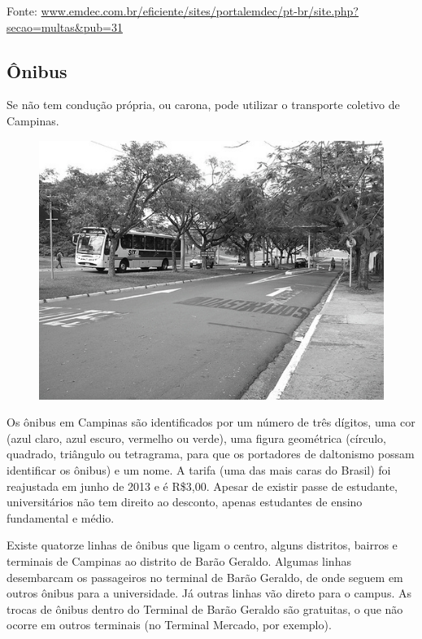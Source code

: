 Fonte: \url{www.emdec.com.br/eficiente/sites/portalemdec/pt-br/site.php?secao=multas&pub=31}

\subsection{Ônibus}

Se não tem condução própria, ou carona, pode utilizar o transporte coletivo de
Campinas.

\begin{figure}[h!]
    \centering
    \includegraphics[scale=0.58,keepaspectratio=true]{img/imgs/8-transporte/-085.jpg}
\end{figure}

Os ônibus em Campinas são identificados por um número de três dígitos, uma cor
(azul claro, azul escuro, vermelho ou verde), uma figura geométrica (círculo,
quadrado, triângulo ou tetragrama, para que os portadores de daltonismo possam
identificar os ônibus) e um nome. A tarifa (uma das mais caras do Brasil) foi
reajustada em junho de 2013 e é R\$3,00. Apesar de existir passe de estudante,
universitários não tem direito ao desconto, apenas estudantes de ensino
fundamental e médio.

Existe quatorze linhas de ônibus que ligam o centro, alguns distritos, bairros e
terminais de Campinas ao distrito de Barão Geraldo. Algumas linhas desembarcam
os passageiros no terminal de Barão Geraldo, de onde seguem em outros ônibus
para a universidade. Já outras linhas vão direto para o campus. As trocas de
ônibus dentro do Terminal de Barão Geraldo são gratuitas, o que não ocorre em
outros terminais (no Terminal Mercado, por exemplo).

